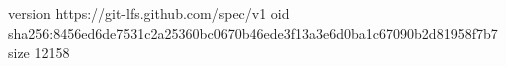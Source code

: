 version https://git-lfs.github.com/spec/v1
oid sha256:8456ed6de7531c2a25360bc0670b46ede3f13a3e6d0ba1c67090b2d81958f7b7
size 12158
